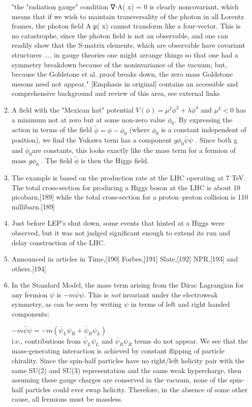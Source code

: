 \begin{enumerate}
"the "radiation gauge" condition ∇⋅A( x) = 0 is clearly noncovariant, which means that if we wish to maintain transversality of the photon in all Lorentz frames, the photon field A μ( x) cannot transform like a four-vector. This is no catastrophe, since the photon field is not an observable, and one can readily show that the S-matrix elements, which are observable have covariant structures .... in gauge theories one might arrange things so that one had a symmetry breakdown because of the noninvariance of the vacuum; but, because the Goldstone et al. proof breaks down, the zero mass Goldstone mesons need not appear." [Emphasis in original]
contains an accessible and comprehensive background and review of this area, see external links
\item A field with the "Mexican hat" potential $V(\phi) = \mu^2 \phi^2 + \lambda \phi^4$ and $\mu^2 < 0$ has a minimum not at zero but at some non-zero value $\phi_0$. By expressing the action in terms of the field  $\tilde{\phi} = \phi - \phi_0$  (where $\phi_0$ is a constant independent of position), we find the Yukawa term has a component $g \phi_0 \bar{\psi} \psi$ . Since both g and $\phi_0$are constants, this looks exactly like the mass term for a fermion of mass $g\phi_0$ . The field  $\tilde{\phi}$ is then the Higgs field.
\item The example is based on the production rate at the LHC operating at 7 TeV. The total cross-section for producing a Higgs boson at the LHC is about 10 picobarn,[189] while the total cross-section for a proton–proton collision is 110 millibarn.[189]
\item Just before LEP's shut down, some events that hinted at a Higgs were observed, but it was not judged significant enough to extend its run and delay construction of the LHC.
\item Announced in articles in Time,[190] Forbes,[191] Slate,[192] NPR,[193] and others.[194]
\item In the Standard Model, the mass term arising from the Dirac Lagrangian for any fermion $\psi$ is $-m \bar{\psi} \psi$. This is \textit{not} invariant under the electroweak symmetry, as can be seen by writing $\psi$ in terms of left and right handed components:

$-m \bar{\psi} \psi = -m (\bar{\psi}_L \psi_R + \bar{\psi}_R \psi_L)$\\

i.e., contributions from  $\bar{\psi}_L \psi_L$ and $\bar{\psi}_R \psi_R$ terms do not appear. We see that the mass-generating interaction is achieved by constant flipping of particle chirality. Since the spin-half particles have no right/left helicity pair with the same SU(2) and SU(3) representation and the same weak hypercharge, then assuming these gauge charges are conserved in the vacuum, none of the spin-half particles could ever swap helicity. Therefore, in the absence of some other cause, all fermions must be massless.


\end{enumerate}

